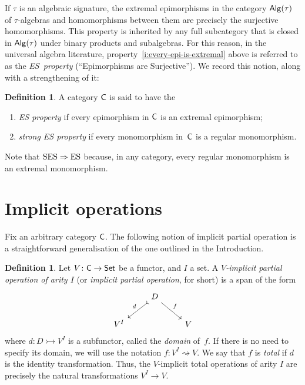 \documentclass[a4paper,10pt,reqno]{amsart}
\theoremstyle{definition}
\newtheorem{definition}[theorem]{Definition}
\theoremstyle{remark}
\newcommand{\cat}{{\sf C}}								%
\newcommand{\Set}{{\sf Set}}							%
\newcommand{\Alg}[1]{{\sf Alg}(#1)}						%
\newcommand{\IMP}{\Rightarrow}						%
\newcommand{\ES}{\textnormal{ES}}
\newcommand{\SES}{\textnormal{SES}}
\begin{document}
If $\tau$ is an algebraic signature, the extremal epimorphisms in the category $\Alg{\tau}$ of $\tau$-algebras and homomorphisms between them are precisely the surjective homomorphisms. This property is inherited by any full subcategory that is closed in $\Alg{\tau}$ under binary products and subalgebras.
%
For this reason, in the universal algebra literature, property~\ref{i:every-epi-is-extremal} above is referred to as the \emph{\ES~property} (``Epimorphisms are Surjective'').
%
We record this notion, along with a strengthening of it:

\begin{definition}
A category $\cat$ is said to have the
\begin{enumerate}
\item[(\ES)]\label{ES} \emph{ES property} if every epimorphism in $\cat$ is an extremal epimorphism;
\item[(\SES)]\label{SES} \emph{strong ES property} if every monomorphism in~$\cat$ is a regular monomorphism.
\end{enumerate}
\end{definition}

Note that $\SES\IMP\ES$ because, in any category, every regular monomorphism is an extremal monomorphism.


\section{Implicit operations}\label{s:implicit-operations-defined}

Fix an arbitrary category $\cat$. The following notion of implicit partial operation is a straightforward generalisation of the one outlined in the Introduction.

\begin{definition}
Let $V\colon \cat\to\Set$ be a functor, and $I$ a set. A \emph{$V$-implicit partial operation of arity $I$} (or \emph{implicit partial operation}, for short) is a span of the form 
\[\begin{tikzcd}
& D \arrow[rightarrowtail]{dl}[swap]{d} \arrow{dr}{f} & \\
V^{I} & & V
\end{tikzcd}\]
where $d\colon D\rightarrowtail V^{I}$ is a subfunctor, called the \emph{domain} of~$f$. If there is no need to specify its domain, we will use the notation $f\colon V^{I} \rightsquigarrow V$. We say that $f$ is \emph{total} if $d$ is the identity transformation. Thus, the $V$-implicit total operations of arity $I$ are precisely the natural transformations $V^{I}\to V$. 
\end{definition}
\end{document}
